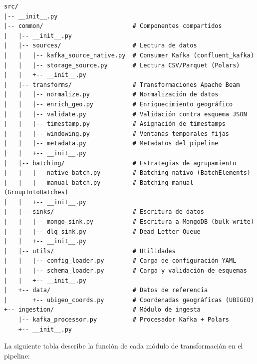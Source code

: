 \documentclass[12pt,a4paper]{article}
\begin{document}
\begin{verbatim}
src/
|-- __init__.py
|-- common/                         # Componentes compartidos
|   |-- __init__.py
|   |-- sources/                    # Lectura de datos
|   |   |-- kafka_source_native.py  # Consumer Kafka (confluent_kafka)
|   |   |-- storage_source.py       # Lectura CSV/Parquet (Polars)
|   |   +-- __init__.py
|   |-- transforms/                 # Transformaciones Apache Beam
|   |   |-- normalize.py            # Normalización de datos
|   |   |-- enrich_geo.py           # Enriquecimiento geográfico
|   |   |-- validate.py             # Validación contra esquema JSON
|   |   |-- timestamp.py            # Asignación de timestamps
|   |   |-- windowing.py            # Ventanas temporales fijas
|   |   |-- metadata.py             # Metadatos del pipeline
|   |   +-- __init__.py
|   |-- batching/                   # Estrategias de agrupamiento
|   |   |-- native_batch.py         # Batching nativo (BatchElements)
|   |   |-- manual_batch.py         # Batching manual (GroupIntoBatches)
|   |   +-- __init__.py
|   |-- sinks/                      # Escritura de datos
|   |   |-- mongo_sink.py           # Escritura a MongoDB (bulk write)
|   |   |-- dlq_sink.py             # Dead Letter Queue
|   |   +-- __init__.py
|   |-- utils/                      # Utilidades
|   |   |-- config_loader.py        # Carga de configuración YAML
|   |   |-- schema_loader.py        # Carga y validación de esquemas
|   |   +-- __init__.py
|   +-- data/                       # Datos de referencia
|       +-- ubigeo_coords.py        # Coordenadas geográficas (UBIGEO)
+-- ingestion/                      # Módulo de ingesta
    |-- kafka_processor.py          # Procesador Kafka + Polars
    +-- __init__.py
\end{verbatim}

La siguiente tabla describe la función de cada módulo de transformación en el pipeline:
\end{document}

